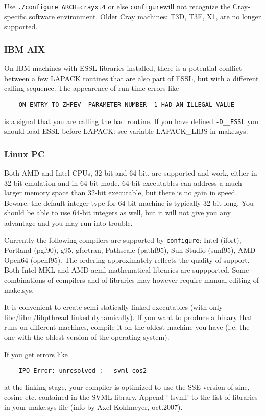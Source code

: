 \documentclass[12pt,a4paper]{article}
\def\configure{\texttt{configure}}
\begin{document}
Use \texttt{./configure ARCH=crayxt4} or else \configure will
not recognize the Cray-specific software environment. Older Cray 
machines: T3D, T3E, X1, are no longer supported.

\subsubsection{IBM AIX}
On IBM machines with ESSL libraries installed, there is a 
potential conflict between a few LAPACK routines that are also part of ESSL, 
but with a different calling sequence. The appearence of run-time errors like
\begin{verbatim}
    ON ENTRY TO ZHPEV  PARAMETER NUMBER  1 HAD AN ILLEGAL VALUE
\end{verbatim}
is a signal that you are calling the bad routine. If you have defined 
\texttt{-D\_\_ESSL} you should load ESSL before LAPACK: see
variable LAPACK\_LIBS in make.sys.

\subsubsection{Linux PC}

Both AMD and Intel CPUs, 32-bit and 64-bit, are supported and work,
either in 32-bit emulation and in 64-bit mode. 64-bit executables 
can address a much larger memory space than 32-bit executable, but
there is no gain in speed.
Beware: the default integer type for 64-bit machine is typically
32-bit long. You should be able to use 64-bit integers as well, 
but it will not give you any advantage and you may run into trouble.

Currently the following compilers are supported by \configure:
Intel (ifort), Portland (pgf90), g95, gfortran, Pathscale (pathf95), 
Sun Studio (sunf95),  AMD Open64 (openf95). The ordering approximately
reflects the quality of support. Both Intel MKL and AMD acml mathematical
libraries are suppported. Some combinations of compilers and of libraries
may however require manual editing of make.sys.

It is convenient to create semi-statically linked executables (with only
libc/libm/libpthread linked dynamically). If you want to produce a binary
that runs on different machines, compile it on the oldest machine you have
(i.e. the one with the oldest version of the operating system).

If you get errors like 
\begin{verbatim}
    IPO Error: unresolved : __svml_cos2
\end{verbatim}
at the linking stage, your compiler is optimized to use the SSE
version of sine, cosine etc. contained in the SVML library. Append
'-lsvml' to the list of libraries in your make.sys file (info by Axel
Kohlmeyer, oct.2007). 
\end{document}
